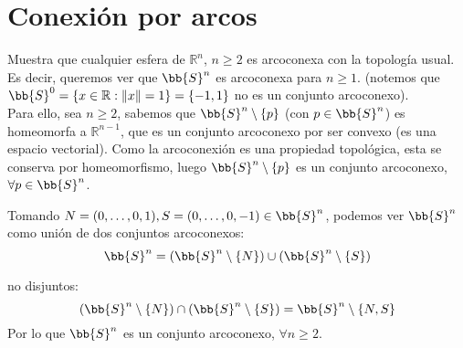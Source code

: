 \section{Conexión por arcos}

\begin{ejercicio}
    Muestra que cualquier esfera de $\mathbb{R}^n$, $n\geq 2$ es arcoconexa con la topología usual.\\

    \noindent
    Es decir, queremos ver que $\bb{S}^n$ es arcoconexa para $n\geq 1$. \newline (notemos que $\bb{S}^0 = \{x\in \mathbb{R} : \|x\| = 1\} = \{-1,1\}$ no es un conjunto arcoconexo).\\

    \noindent
    Para ello, sea $n\geq 2$, sabemos que $\bb{S}^n\setminus\{p\}$ (con $p\in \bb{S}^n$) es homeomorfa a $\mathbb{R}^{n-1}$, que es un conjunto arcoconexo por ser convexo (es una espacio vectorial). Como la arcoconexión es una propiedad topológica, esta se conserva por homeomorfismo, luego $\bb{S}^n\setminus \{p\}$ es un conjunto arcoconexo, $\forall p\in \bb{S}^n$.

    Tomando $N = (0,\ldots,0,1), S =(0,\ldots,0,-1) \in \bb{S}^n$, podemos ver $\bb{S}^n$ como unión de dos conjuntos arcoconexos:
    \begin{equation*}
        \bb{S}^n = (\bb{S}^n\setminus\{N\}) \cup (\bb{S}^n\setminus\{S\})
    \end{equation*}

    no disjuntos:
    \begin{equation*}
        (\bb{S}^n\setminus\{N\}) \cap (\bb{S}^n\setminus\{S\}) = \bb{S}^n\setminus\{N,S\}
    \end{equation*}
    Por lo que $\bb{S}^n$ es un conjunto arcoconexo, $\forall n\geq 2$.
\end{ejercicio}

